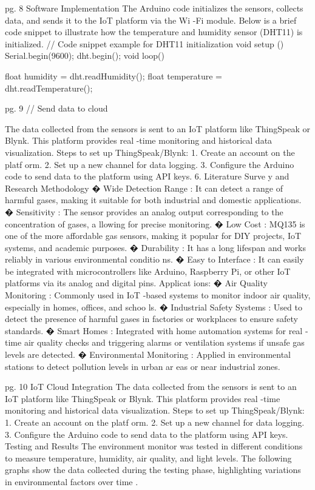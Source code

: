 \documentclass{article}
\begin{document}
 pg. 8   Software Implementation   The Arduino code initializes the sensors, collects data, and sends it to the IoT platform via  the Wi -Fi module. Below is a brief code snippet to illustrate how the temperature and  humidity sensor  (DHT11) is initialized.   // Code snippet example for DHT11 initialization   void setup () {    Serial.begin(9600);     dht.begin();   }  void loop() {     float humidity = dht.readHumidity();     float temperature = dht.readTemperature();   

 pg. 9   // Send data to cloud   }  The data collected from the sensors is sent to an IoT platform like ThingSpeak or Blynk. This  platform provides real -time monitoring and historical data visualization.   Steps to set up ThingSpeak/Blynk:   1. Create an account on the platf orm.   2. Set up a new channel for data logging.   3. Configure the Arduino code to send data to the platform using API keys.   6. Literature Surve y and Research Methodology   � Wide Detection Range : It can detect a range of harmful gases, making it suitable for  both industrial and domestic applications.   � Sensitivity : The sensor provides an analog output corresponding to the concentration of  gases, a llowing for precise monitoring.   � Low Cost : MQ135 is one of the more affordable gas sensors, making it popular for  DIY projects, IoT systems, and academic purposes.   � Durability : It has a long lifespan and works reliably in various environmental  conditio ns.  � Easy to Interface : It can easily be integrated with microcontrollers like Arduino,  Raspberry Pi, or other IoT platforms via its analog and digital pins.     Applicat ions:  � Air Quality Monitoring : Commonly used in IoT -based systems to monitor indoor air  quality, especially in homes, offices, and schoo ls.  � Industrial Safety Systems : Used to detect the presence of harmful gases in factories or  workplaces to ensure safety standards.   � Smart Homes : Integrated with home automation systems for real -time air quality  checks and triggering alarms or ventilation systems if unsafe gas levels are detected.   � Environmental Monitoring : Applied in environmental stations to detect pollution  levels in urban ar eas or near industrial zones.     

 pg. 10 IoT Cloud Integration   The data collected from the sensors is sent to an IoT platform like ThingSpeak or Blynk. This  platform provides real -time monitoring and historical data visualization.   Steps to set up ThingSpeak/Blynk:   1. Create an account on the platf orm.   2. Set up a new channel for data logging.   3. Configure the Arduino code to send data to the platform using API keys.   Testing and Results   The environment monitor was tested in different conditions to measure temperature,  humidity, air quality, and light levels. The following graphs show the data collected during  the testing phase, highlighting variations in environmental factors over time .    
\end{document}
